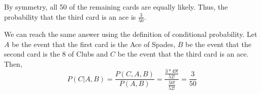 By symmetry, all 50 of the remaining cards are equally likely. Thus, the 
probability that the third card is an ace is $\frac{3}{50}$.

We can reach the same answer using the definition of conditional probability. 
Let $A$ be the event that the first card is the Ace of Spades, $B$ be the event 
that the second card is the $8$ of Clubs and $C$ be the event that the third 
card is an ace. Then, 
$$P(C|A,B) = \frac{P(C,A,B)}{P(A,B)} = \frac{\frac{3*49!}{52!}}{\frac{50!}{52!}} 
= \frac{3}{50}$$